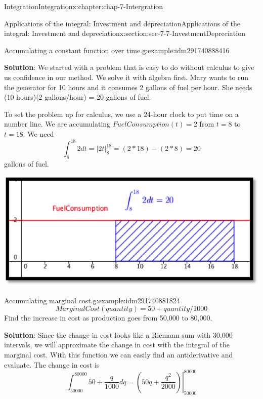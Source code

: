 \documentclass[oneside,10pt,]{book}
\newcommand{\terminology}[1]{\textbf{#1}}
\numberwithin{equation}{section}
\begin{document}
\begin{chapterptx}{Integration}{}{Integration}{}{}{x:chapter:chap-7-Intergration}
\begin{sectionptx}{Applications of the integral: Investment and depreciation}{}{Applications of the integral: Investment and depreciation}{}{}{x:section:sec-7-7-InvestmentDepreciation}
\begin{example}{Accumulating a constant function over time.}{g:example:idm291740888416}
\par
\terminology{Solution}: We started with a problem that is easy to do without calculus to give us confidence in our method.  We solve it with algebra first.  Mary wants to run the generator for 10 hours and it consumes 2 gallons of fuel per hour.  She needs (10 hours)(2 gallons\slash{}hour) = 20 gallons of fuel.%
\par
To set the problem up for calculus, we use a 24-hour clock to put time on a number line.  We are accumulating \(FuelConsumption(t)=2\) from \(t=8\) to \(t=18\).  We need%
%
\begin{equation*}
\int_8^{18} 2 dt=|2t|_8^{18}=(2*18)-(2*8)=20
\end{equation*}
gallons of fuel.%
\begin{sidebyside}{1}{0.15}{0.15}{0}%
\begin{sbspanel}{0.7}%
\includegraphics[width=\linewidth]{images/sec7-7-1.png}
\end{sbspanel}%
\end{sidebyside}%
\end{example}
\begin{example}{Accumulating marginal cost.}{g:example:idm291740881824}%
%
\begin{equation*}
Marginal Cost(quantity)=50+quantity/1000
\end{equation*}
Find the increase in cost as production goes from 50,000 to 80,000.%
\par
\terminology{Solution}: Since the change in cost looks like a Riemann sum with 30,000 intervals, we will approximate the change in cost with the integral of the marginal cost.  With this function we can easily find an antiderivative and evaluate. The change in cost is%
%
\begin{equation*}
\int_{50000}^{80000} 50+\frac{q}{1000} dq=
\left.\left( 
50q+\frac{q^2}{2000}
\right)\right|_{50000}^{80000}
\end{equation*}
%
\begin{equation*}

\end{equation*}
\end{example}
\end{sectionptx}
\end{chapterptx}
\end{document}
